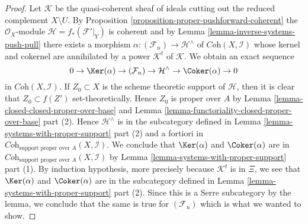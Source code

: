 \begin{proof}
\medskip\noindent
Let $\mathcal{K}$ be the quasi-coherent sheaf of ideals cutting
out the reduced complement $X \setminus U$. By
Proposition \ref{proposition-proper-pushforward-coherent}
the $\mathcal{O}_X$-module $\mathcal{H} = f_*(\mathcal{F}'|_Y)$ is coherent
and by Lemma \ref{lemma-inverse-systems-push-pull}
there exists a morphism $\alpha : (\mathcal{F}_n) \to \mathcal{H}^\wedge$
of $\textit{Coh}(X, \mathcal{I})$ whose kernel and cokernel are
annihilated by a power $\mathcal{K}^t$ of $\mathcal{K}$.
We obtain an exact sequence
$$
0 \to \Ker(\alpha) \to (\mathcal{F}_n) \to
\mathcal{H}^\wedge \to \Coker(\alpha) \to 0
$$
in $\textit{Coh}(X, \mathcal{I})$. If $Z_0 \subset X$ is the scheme theoretic
support of $\mathcal{H}$, then it is clear that $Z_0 \subset f(Z')$
set-theoretically. Hence $Z_0$ is proper over $A$ by
Lemma \ref{lemma-closed-closed-proper-over-base} and
Lemma \ref{lemma-functoriality-closed-proper-over-base} part (2).
Hence $\mathcal{H}^\wedge$ is in the subcategory defined in
Lemma \ref{lemma-systems-with-proper-support} part (2)
and a fortiori in
$\textit{Coh}_{\text{support proper over }A}(X, \mathcal{I})$.
We conclude that $\Ker(\alpha)$ and $\Coker(\alpha)$
are in $\textit{Coh}_{\text{support proper over }A}(X, \mathcal{I})$
by Lemma \ref{lemma-systems-with-proper-support} part (1).
By induction hypothesis, more precisely because $\mathcal{K}^t$ is in $\Xi$,
we see that $\Ker(\alpha)$ and $\Coker(\alpha)$ are in
the subcategory defined in
Lemma \ref{lemma-systems-with-proper-support} part (2).
Since this is a Serre subcategory by the lemma, we conclude that the
same is true for $(\mathcal{F}_n)$ which is what we wanted to show.
\end{proof}

